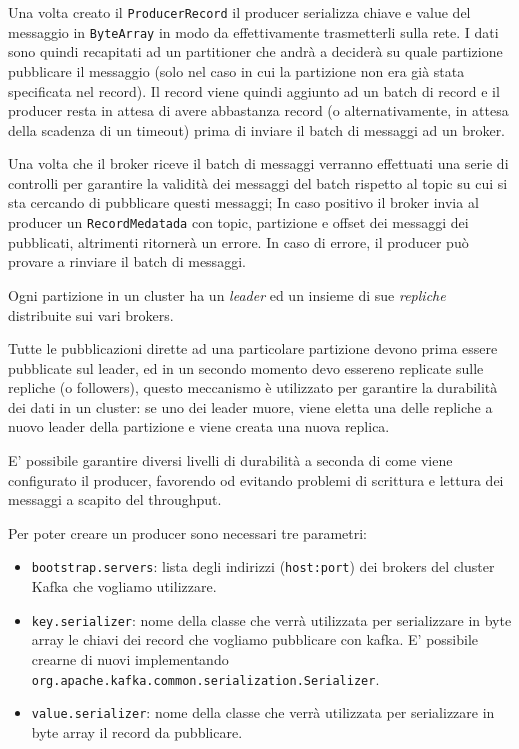 \documentclass[]{article}
\providecommand{\tightlist}{%
  \setlength{\itemsep}{0pt}\setlength{\parskip}{0pt}}
\begin{document}
Una volta creato il \texttt{ProducerRecord} il producer serializza
chiave e value del messaggio in \texttt{ByteArray} in modo da
effettivamente trasmetterli sulla rete. I dati sono quindi recapitati ad
un partitioner che andrà a deciderà su quale partizione pubblicare il
messaggio (solo nel caso in cui la partizione non era già stata
specificata nel record). Il record viene quindi aggiunto ad un batch di
record e il producer resta in attesa di avere abbastanza record (o
alternativamente, in attesa della scadenza di un timeout) prima di
inviare il batch di messaggi ad un broker.

Una volta che il broker riceve il batch di messaggi verranno effettuati
una serie di controlli per garantire la validità dei messaggi del batch
rispetto al topic su cui si sta cercando di pubblicare questi messaggi;
In caso positivo il broker invia al producer un \texttt{RecordMedatada}
con topic, partizione e offset dei messaggi dei pubblicati, altrimenti
ritornerà un errore. In caso di errore, il producer può provare a
rinviare il batch di messaggi.

Ogni partizione in un cluster ha un \emph{leader} ed un insieme di sue
\emph{repliche} distribuite sui vari brokers.

Tutte le pubblicazioni dirette ad una particolare partizione devono
prima essere pubblicate sul leader, ed in un secondo momento devo
essereno replicate sulle repliche (o followers), questo meccanismo è
utilizzato per garantire la durabilità dei dati in un cluster: se uno
dei leader muore, viene eletta una delle repliche a nuovo leader della
partizione e viene creata una nuova replica.

E' possibile garantire diversi livelli di durabilità a seconda di come
viene configurato il producer, favorendo od evitando problemi di
scrittura e lettura dei messaggi a scapito del throughput.

\newpage

Per poter creare un producer sono necessari tre parametri:

\begin{itemize}
\tightlist
\item
  \texttt{bootstrap.servers}: lista degli indirizzi (\texttt{host:port})
  dei brokers del cluster Kafka che vogliamo utilizzare.
\item
  \texttt{key.serializer}: nome della classe che verrà utilizzata per
  serializzare in byte array le chiavi dei record che vogliamo
  pubblicare con kafka. E' possibile crearne di nuovi implementando
  \texttt{org.apache.kafka.common.serialization.Serializer}.
\item
  \texttt{value.serializer}: nome della classe che verrà utilizzata per
  serializzare in byte array il record da pubblicare.
\end{itemize}
\end{document}
